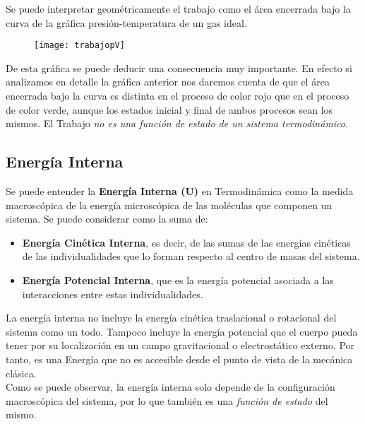 Se puede interpretar geométricamente el trabajo como el área encerrada bajo la curva de la gráfica presión-temperatura de un gas ideal.

\begin{figure}[h!]
	\centering
	\texttt{[image: trabajopV]}
\end{figure}

De esta gráfica se puede deducir una consecuencia muy importante. En efecto si analizamos en detalle la gráfica anterior nos daremos cuenta de que el área encerrada bajo la curva es distinta en el proceso de color rojo que en el proceso de color verde, aunque los estados inicial y final de ambos procesos sean los mismos. El Trabajo \emph{no es una función de estado de un sistema termodinámico}.\\

\subsection{Energía Interna}

Se puede entender la \textbf{Energía Interna (U)} en Termodinámica como la medida macroscópica de la energía microscópica de las moléculas que componen un sistema. Se puede considerar como la suma de:\\

\begin{itemize}
	
	\item \textbf{Energía Cinética Interna}, es decir, de las sumas de las energías cinéticas de las individualidades que lo forman respecto al centro de masas del sistema.
	
	\item  \textbf{Energía Potencial Interna}, que es la energía potencial asociada a las interacciones entre estas individualidades.
	
\end{itemize}

La energía interna no incluye la energía cinética traslacional o rotacional del sistema como un todo. Tampoco incluye la energía potencial que el cuerpo pueda tener por su localización en un campo gravitacional o electrostático externo. Por tanto, es una Energía que no es accesible desde el punto de vista de la mecánica clásica.\\

Como se puede observar, la energía interna solo depende de la configuración macroscópica del sistema, por lo que también es una \emph{función de estado} del mismo. 

